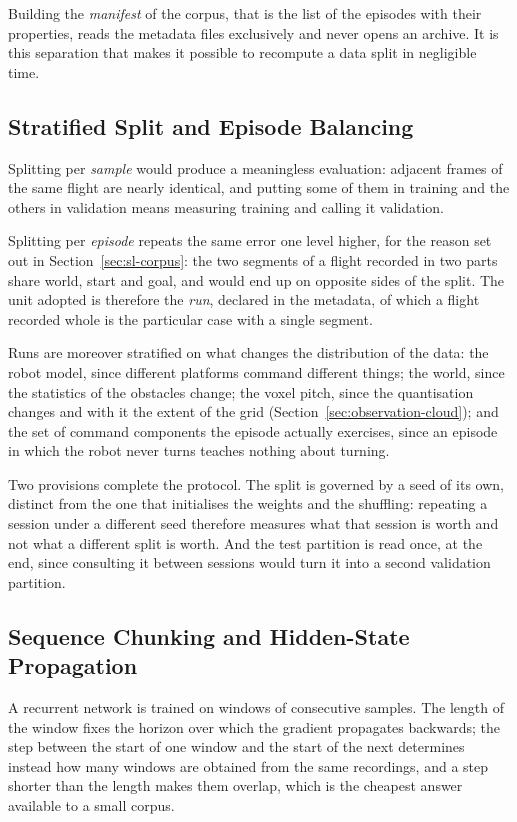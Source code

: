 Building the \emph{manifest} of the corpus, that is the list of the episodes
with their properties, reads the metadata files exclusively and never opens an
archive. It is this separation that makes it possible to recompute a data split
in negligible time.

\subsection{Stratified Split and Episode Balancing}
\label{sec:sl-split}

Splitting per \emph{sample} would produce a meaningless evaluation: adjacent
frames of the same flight are nearly identical, and putting some of them in
training and the others in validation means measuring training and calling it
validation.

Splitting per \emph{episode} repeats the same error one level higher, for the
reason set out in Section~\ref{sec:sl-corpus}: the two segments of a flight
recorded in two parts share world, start and goal, and would end up on opposite
sides of the split. The unit adopted is therefore the \emph{run}, declared in
the metadata, of which a flight recorded whole is the particular case with a
single segment.

Runs are moreover stratified on what changes the distribution of the data: the
robot model, since different platforms command different things; the world,
since the statistics of the obstacles change; the voxel pitch, since the
quantisation changes and with it the extent of the grid
(Section~\ref{sec:observation-cloud}); and the set of command components the
episode actually exercises, since an episode in which the robot never turns
teaches nothing about turning.

Two provisions complete the protocol. The split is governed by a seed of its
own, distinct from the one that initialises the weights and the shuffling:
repeating a session under a different seed therefore measures what that session
is worth and not what a different split is worth. And the test partition is read
once, at the end, since consulting it between sessions would turn it into a
second validation partition.

\subsection{Sequence Chunking and Hidden-State Propagation}
\label{sec:sl-sequences}

A recurrent network is trained on windows of consecutive samples. The length of
the window fixes the horizon over which the gradient propagates backwards; the
step between the start of one window and the start of the next determines
instead how many windows are obtained from the same recordings, and a step
shorter than the length makes them overlap, which is the cheapest answer
available to a small corpus.

